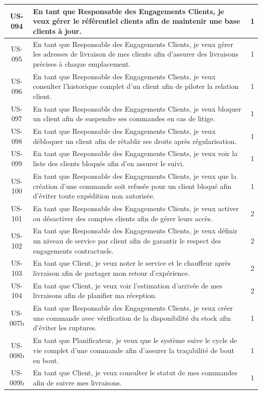 \begin{longtable}{|c|>{\raggedright\arraybackslash}p{13cm}|c|}
US-094 & En tant que Responsable des Engagements Clients, je veux gérer le référentiel clients afin de maintenir une base clients à jour. & 1 \\\hline
US-095 & En tant que Responsable des Engagements Clients, je veux gérer les adresses de livraison de mes clients afin d'assurer des livraisons précises à chaque emplacement. & 1 \\\hline
US-096 & En tant que Responsable des Engagements Clients, je veux consulter l'historique complet d'un client afin de piloter la relation client. & 1 \\\hline
US-097 & En tant que Responsable des Engagements Clients, je veux bloquer un client afin de suspendre ses commandes en cas de litige. & 1 \\\hline
US-098 & En tant que Responsable des Engagements Clients, je veux débloquer un client afin de rétablir ses droits après régularisation. & 1 \\\hline
US-099 & En tant que Responsable des Engagements Clients, je veux voir la liste des clients bloqués afin d'en assurer le suivi. & 1 \\\hline
US-100 & En tant que Responsable des Engagements Clients, je veux que la création d'une commande soit refusée pour un client bloqué afin d'éviter toute expédition non autorisée. & 1 \\\hline
US-101 & En tant que Responsable des Engagements Clients, je veux activer ou désactiver des comptes clients afin de gérer leurs accès. & 2 \\\hline
US-102 & En tant que Responsable des Engagements Clients, je veux définir un niveau de service par client afin de garantir le respect des engagements contractuels. & 2 \\\hline
US-103 & En tant que Client, je veux noter le service et le chauffeur après livraison afin de partager mon retour d'expérience. & 2 \\\hline
US-104 & En tant que Client, je veux voir l'estimation d'arrivée de mes livraisons afin de planifier ma réception. & 2 \\\hline
US-007b & En tant que Responsable des Engagements Clients, je veux créer une commande avec vérification de la disponibilité du stock afin d'éviter les ruptures. & 1 \\\hline
US-008b & En tant que Planificateur, je veux que le système suive le cycle de vie complet d'une commande afin d'assurer la traçabilité de bout en bout. & 1 \\\hline
US-009b & En tant que Client, je veux consulter le statut de mes commandes afin de suivre mes livraisons. & 1 \\\hline

\end{longtable}

